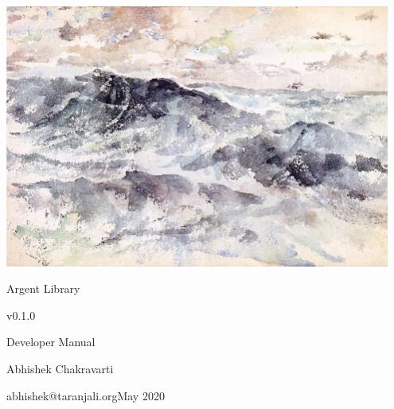 \documentclass[twoside,12pt,english]{book}
\begin{document}
%
%
\begin{titlepage}
\centering
\includegraphics[width=0.95\textwidth]{the-great-sea.jpg}\par\vspace{1em}
\Huge Argent Library\par\vspace{0.5em}\large v0.1.0\par\vspace{0.5em} 
\LARGE Developer Manual\par\vspace{5em} Abhishek Chakravarti\par
\vspace{0.5em}\small abhishek@taranjali.org\vfill\large May 2020
\end{titlepage}
\end{document}
